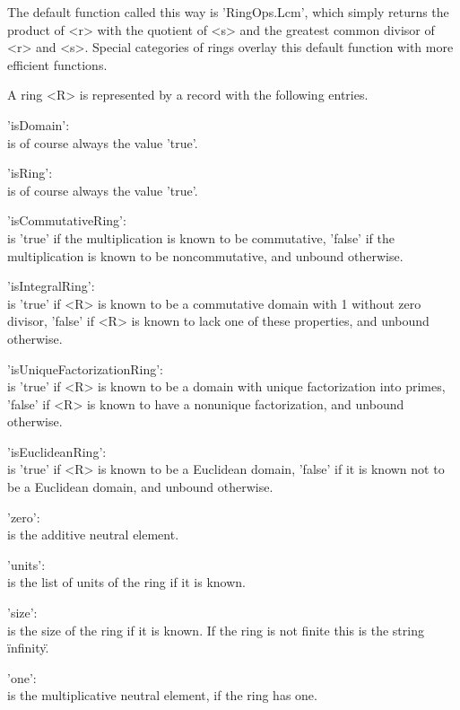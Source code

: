 The  default  function called  this  way is 'RingOps.Lcm',  which  simply
returns the  product of <r>  with the  quotient  of <s> and the  greatest
common divisor of <r> and <s>.   Special categories of rings overlay this
default function with more efficient functions.


A ring <R> is represented by a record with the following entries.

'isDomain':\\
        is of course always the value 'true'.

'isRing': \\
        is of course always the value 'true'.

'isCommutativeRing': \\
        is 'true' if  the  multiplication  is  known to  be  commutative,
        'false' if the multiplication is known  to be noncommutative, and
        unbound otherwise.

'isIntegralRing': \\
        is  'true' if  <R> is  known  to be a commutative  domain  with 1
        without zero divisor, 'false' if <R> is  known  to  lack  one  of
        these properties, and unbound otherwise.

'isUniqueFactorizationRing': \\
        is   'true'  if <R>   is    known to be   a   domain with  unique
        factorization into primes,  'false' if  <R> is   known to have  a
        nonunique factorization, and unbound otherwise.

'isEuclideanRing': \\
        is 'true' if <R> is known to be a Euclidean domain, 'false' if it
        is known not to be a Euclidean domain, and unbound otherwise.

'zero': \\
        is the additive neutral element.

'units': \\
        is the list of units of the ring if it is known.

'size': \\
        is the size  of the ring if it is  known.  If  the  ring  is  not
        finite this is the string \"infinity\".

'one': \\
        is the  multiplicative  neutral element,  if the ring has one.


